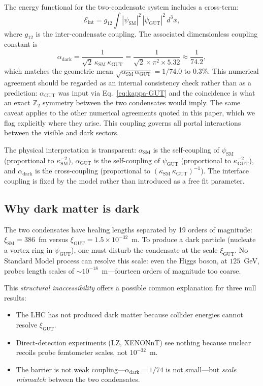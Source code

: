 \documentclass[11pt]{article}
\begin{document}
The energy functional for the two-condensate system includes a cross-term:
\begin{equation}
\mathcal{E}_\text{int} = g_{12}\int |\psi_\text{SM}|^2\,|\psi_\text{GUT}|^2\,d^3x,
\label{eq:cross-term}
\end{equation}
where $g_{12}$ is the inter-condensate coupling.
The associated dimensionless coupling constant is
\begin{equation}
\alpha_\text{dark} = \frac{1}{\sqrt{2}\,\kappa_\text{SM}\,\kappa_\text{GUT}} = \frac{1}{\sqrt{2} \times \pi^2 \times 5.32} \approx \frac{1}{74.2},
\label{eq:alpha-dark}
\end{equation}
which matches the geometric mean $\sqrt{\alpha_\text{SM}\,\alpha_\text{GUT}} = 1/74.0$ to $0.3\%$.
This numerical agreement should be regarded as an internal consistency check rather than as a prediction: $\alpha_\text{GUT}$ was input via Eq.~\eqref{eq:kappa-GUT} and the coincidence is what an exact $\mathbb{Z}_2$ symmetry between the two condensates would imply.
The same caveat applies to the other numerical agreements quoted in this paper, which we flag explicitly where they arise.
This coupling governs all portal interactions between the visible and dark sectors.

The physical interpretation is transparent: $\alpha_\text{SM}$ is the self-coupling of $\psi_\text{SM}$ (proportional to $\kappa_\text{SM}^{-2}$), $\alpha_\text{GUT}$ is the self-coupling of $\psi_\text{GUT}$ (proportional to $\kappa_\text{GUT}^{-2}$), and $\alpha_\text{dark}$ is the cross-coupling (proportional to $(\kappa_\text{SM}\,\kappa_\text{GUT})^{-1}$).
The interface coupling is fixed by the model rather than introduced as a free fit parameter.

\subsection{Why dark matter is dark}

The two condensates have healing lengths separated by 19 orders of magnitude: $\xi_\text{SM} = 386$~fm versus $\xi_\text{GUT} = 1.5 \times 10^{-32}$~m.
To produce a dark particle (nucleate a vortex ring in $\psi_\text{GUT}$), one must disturb the condensate at the scale $\xi_\text{GUT}$.
No Standard Model process can resolve this scale: even the Higgs boson, at $125$~GeV, probes length scales of $\sim 10^{-18}$~m---fourteen orders of magnitude too coarse.

This \emph{structural inaccessibility} offers a possible common explanation for three null results:
\begin{itemize}
\item The LHC has not produced dark matter because collider energies cannot resolve $\xi_\text{GUT}$.
\item Direct-detection experiments (LZ, XENONnT) see nothing because nuclear recoils probe femtometer scales, not $10^{-32}$~m.
\item The barrier is not weak coupling---$\alpha_\text{dark} = 1/74$ is not small---but \emph{scale mismatch} between the two condensates.
\end{itemize}
\end{document}
